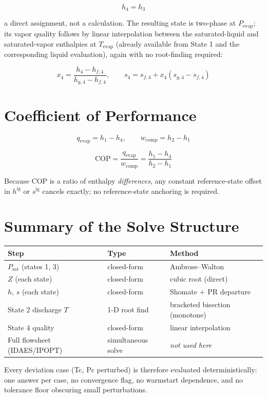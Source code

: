 \documentclass[11pt]{article}
\begin{document}
\begin{equation}
h_4 = h_3
\end{equation}

a direct assignment, not a calculation. The resulting state is two-phase at
$P_{\text{evap}}$; its vapor quality follows by linear interpolation between
the saturated-liquid and saturated-vapor enthalpies at $T_{\text{evap}}$
(already available from State 1 and the corresponding liquid evaluation),
again with no root-finding required:

\begin{equation}
x_4 = \frac{h_4 - h_{f,4}}{h_{g,4} - h_{f,4}}, \qquad
s_4 = s_{f,4} + x_4\left(s_{g,4} - s_{f,4}\right)
\end{equation}

\section{Coefficient of Performance}

\begin{equation}
q_{\text{evap}} = h_1 - h_4, \qquad w_{\text{comp}} = h_2 - h_1
\end{equation}

\begin{equation}
\boxed{\text{COP} = \dfrac{q_{\text{evap}}}{w_{\text{comp}}}
= \dfrac{h_1 - h_4}{h_2 - h_1}}
\end{equation}

Because COP is a ratio of enthalpy \emph{differences}, any constant
reference-state offset in $h^{\text{ig}}$ or $s^{\text{ig}}$ cancels
exactly; no reference-state anchoring is required.

\section{Summary of the Solve Structure}

\begin{center}
\begin{tabular}{lll}
\textbf{Step} & \textbf{Type} & \textbf{Method} \\
\hline
$P_{\text{sat}}$ (states 1, 3) & closed-form & Ambrose--Walton \\
$Z$ (each state) & closed-form & cubic root (direct) \\
$h,\,s$ (each state) & closed-form & Shomate $+$ PR departure \\
State 2 discharge $T$ & 1-D root find & bracketed bisection (monotone) \\
State 4 quality & closed-form & linear interpolation \\
\hline
Full flowsheet (IDAES/IPOPT) & simultaneous solve & \emph{not used here} \\
\end{tabular}
\end{center}

Every deviation case (Tc, Pc perturbed) is therefore evaluated
deterministically: one answer per case, no convergence flag, no warmstart
dependence, and no tolerance floor obscuring small perturbations.
\end{document}
